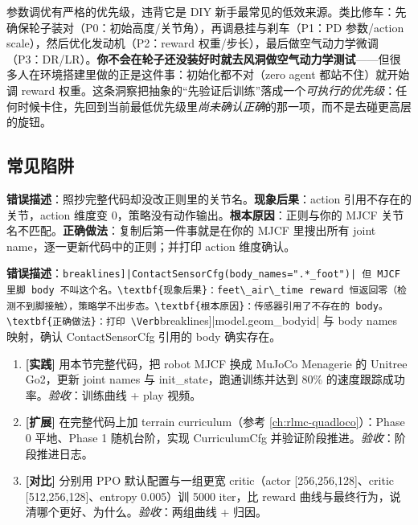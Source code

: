 \begin{insight}\label{ins:rlmc-diy-carfix}
参数调优有严格的优先级，违背它是 DIY 新手最常见的低效来源。类比修车：先确保轮子装对（P0：初始高度/关节角），再调悬挂与刹车（P1：PD 参数/action scale），然后优化发动机（P2：reward 权重/步长），最后做空气动力学微调（P3：DR/LR）。\textbf{你不会在轮子还没装好时就去风洞做空气动力学测试}——但很多人在环境搭建里做的正是这件事：初始化都不对（zero agent 都站不住）就开始调 reward 权重。这条洞察把抽象的“先验证后训练”落成一个\emph{可执行的优先级}：任何时候卡住，先回到当前最低优先级里\emph{尚未确认正确}的那一项，而不是去碰更高层的旋钮。
\end{insight}

\subsection{常见陷阱}
\label{sec:rlmc-diy-fullcode-pitfalls}

\begin{pitfall}
\textbf{错误描述}：照抄完整代码却没改正则里的关节名。\textbf{现象后果}：action 引用不存在的关节，action 维度变 0，策略没有动作输出。\textbf{根本原因}：正则与你的 MJCF 关节名不匹配。\textbf{正确做法}：复制后第一件事就是在你的 MJCF 里搜出所有 joint name，逐一更新代码中的正则；并打印 action 维度确认。
\end{pitfall}

\begin{pitfall}
\textbf{错误描述}：\Verb[breaklines]|ContactSensorCfg(body_names=".*_foot")| 但 MJCF 里脚 body 不叫这个名。\textbf{现象后果}：feet\_air\_time reward 恒返回零（检测不到脚接触），策略学不出步态。\textbf{根本原因}：传感器引用了不存在的 body。\textbf{正确做法}：打印 \Verb[breaklines]|model.geom_bodyid| 与 body names 映射，确认 ContactSensorCfg 引用的 body 确实存在。
\end{pitfall}

\begin{practice}[完整代码综合]
\begin{enumerate}
\item \textbf{[实践]} 用本节完整代码，把 robot MJCF 换成 MuJoCo Menagerie 的 Unitree Go2，更新 joint names 与 init\_state，跑通训练并达到 $80\%$ 的速度跟踪成功率。\emph{验收}：训练曲线 + play 视频。
\item \textbf{[扩展]} 在完整代码上加 terrain curriculum（参考 \cref{ch:rlmc-quadloco}）：Phase 0 平地、Phase 1 随机台阶，实现 CurriculumCfg 并验证阶段推进。\emph{验收}：阶段推进日志。
\item \textbf{[对比]} 分别用 PPO 默认配置与一组更宽 critic（actor [256,256,128]、critic [512,256,128]、entropy 0.005）训 5000 iter，比 reward 曲线与最终行为，说清哪个更好、为什么。\emph{验收}：两组曲线 + 归因。
\end{enumerate}
\end{practice}


